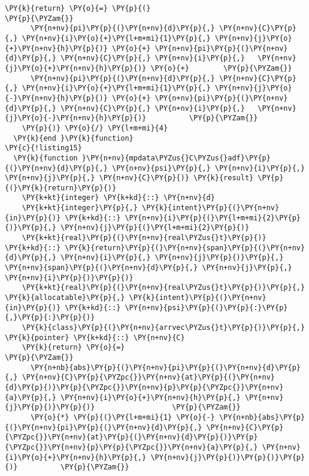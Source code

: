 \begin{Verbatim}[commandchars=\\\{\}]
    \PY{k}{return} \PY{o}{=} \PY{p}{(}                                         \PY{p}{\PYZam{}}
      \PY{n+nv}{pi}\PY{p}{(}\PY{n+nv}{d}\PY{p}{,} \PY{n+nv}{C}\PY{p}{,} \PY{n+nv}{i}\PY{o}{+}\PY{l+m+mi}{1}\PY{p}{,} \PY{n+nv}{j}\PY{o}{+}\PY{n+nv}{h}\PY{p}{)} \PY{o}{+} \PY{n+nv}{pi}\PY{p}{(}\PY{n+nv}{d}\PY{p}{,} \PY{n+nv}{C}\PY{p}{,} \PY{n+nv}{i}\PY{p}{,}   \PY{n+nv}{j}\PY{o}{+}\PY{n+nv}{h}\PY{p}{)} \PY{o}{+}        \PY{p}{\PYZam{}}
      \PY{n+nv}{pi}\PY{p}{(}\PY{n+nv}{d}\PY{p}{,} \PY{n+nv}{C}\PY{p}{,} \PY{n+nv}{i}\PY{o}{+}\PY{l+m+mi}{1}\PY{p}{,} \PY{n+nv}{j}\PY{o}{-}\PY{n+nv}{h}\PY{p}{)} \PY{o}{+} \PY{n+nv}{pi}\PY{p}{(}\PY{n+nv}{d}\PY{p}{,} \PY{n+nv}{C}\PY{p}{,} \PY{n+nv}{i}\PY{p}{,}   \PY{n+nv}{j}\PY{o}{-}\PY{n+nv}{h}\PY{p}{)}          \PY{p}{\PYZam{}}
    \PY{p}{)} \PY{o}{/} \PY{l+m+mi}{4}               
  \PY{k}{end }\PY{k}{function}
\PY{c}{!listing15}
  \PY{k}{function }\PY{n+nv}{mpdata\PYZus{}C\PYZus{}adf}\PY{p}{(}\PY{n+nv}{d}\PY{p}{,} \PY{n+nv}{psi}\PY{p}{,} \PY{n+nv}{i}\PY{p}{,} \PY{n+nv}{j}\PY{p}{,} \PY{n+nv}{C}\PY{p}{)} \PY{k}{result} \PY{p}{(}\PY{k}{return}\PY{p}{)}
    \PY{k+kt}{integer} \PY{k+kd}{::} \PY{n+nv}{d}
    \PY{k+kt}{integer}\PY{p}{,} \PY{k}{intent}\PY{p}{(}\PY{n+nv}{in}\PY{p}{)} \PY{k+kd}{::} \PY{n+nv}{i}\PY{p}{(}\PY{l+m+mi}{2}\PY{p}{)}\PY{p}{,} \PY{n+nv}{j}\PY{p}{(}\PY{l+m+mi}{2}\PY{p}{)}
    \PY{k+kt}{real}\PY{p}{(}\PY{n+nv}{real\PYZus{}t}\PY{p}{)} \PY{k+kd}{::} \PY{k}{return}\PY{p}{(}\PY{n+nv}{span}\PY{p}{(}\PY{n+nv}{d}\PY{p}{,} \PY{n+nv}{i}\PY{p}{,} \PY{n+nv}{j}\PY{p}{)}\PY{p}{,} \PY{n+nv}{span}\PY{p}{(}\PY{n+nv}{d}\PY{p}{,} \PY{n+nv}{j}\PY{p}{,} \PY{n+nv}{i}\PY{p}{)}\PY{p}{)}
    \PY{k+kt}{real}\PY{p}{(}\PY{n+nv}{real\PYZus{}t}\PY{p}{)}\PY{p}{,} \PY{k}{allocatable}\PY{p}{,} \PY{k}{intent}\PY{p}{(}\PY{n+nv}{in}\PY{p}{)} \PY{k+kd}{::} \PY{n+nv}{psi}\PY{p}{(}\PY{p}{:}\PY{p}{,}\PY{p}{:}\PY{p}{)} 
    \PY{k}{class}\PY{p}{(}\PY{n+nv}{arrvec\PYZus{}t}\PY{p}{)}\PY{p}{,} \PY{k}{pointer} \PY{k+kd}{::} \PY{n+nv}{C}
    \PY{k}{return} \PY{o}{=}                                           \PY{p}{\PYZam{}}
      \PY{n+nb}{abs}\PY{p}{(}\PY{n+nv}{pi}\PY{p}{(}\PY{n+nv}{d}\PY{p}{,} \PY{n+nv}{C}\PY{p}{\PYZpc{}}\PY{n+nv}{at}\PY{p}{(}\PY{n+nv}{d}\PY{p}{)}\PY{p}{\PYZpc{}}\PY{n+nv}{p}\PY{p}{\PYZpc{}}\PY{n+nv}{a}\PY{p}{,} \PY{n+nv}{i}\PY{o}{+}\PY{n+nv}{h}\PY{p}{,} \PY{n+nv}{j}\PY{p}{)}\PY{p}{)}                  \PY{p}{\PYZam{}}
      \PY{o}{*} \PY{p}{(}\PY{l+m+mi}{1} \PY{o}{-} \PY{n+nb}{abs}\PY{p}{(}\PY{n+nv}{pi}\PY{p}{(}\PY{n+nv}{d}\PY{p}{,} \PY{n+nv}{C}\PY{p}{\PYZpc{}}\PY{n+nv}{at}\PY{p}{(}\PY{n+nv}{d}\PY{p}{)}\PY{p}{\PYZpc{}}\PY{n+nv}{p}\PY{p}{\PYZpc{}}\PY{n+nv}{a}\PY{p}{,} \PY{n+nv}{i}\PY{o}{+}\PY{n+nv}{h}\PY{p}{,} \PY{n+nv}{j}\PY{p}{)}\PY{p}{)}\PY{p}{)}          \PY{p}{\PYZam{}}

\end{Verbatim}
